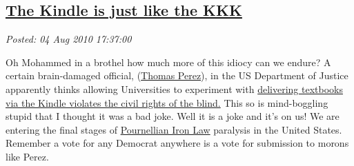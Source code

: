 %

\subsection*{\href{https://bakerjd99.wordpress.com/2010/08/04/the-kindle-is-just-like-the-kkk/}{The Kindle is just like the KKK}}


\noindent\emph{Posted: 04 Aug 2010 17:37:00}
\vspace{6pt}

Oh Mohammed in a brothel how much more of this idiocy can we endure? A
certain brain-damaged official,
(\href{http://en.wikipedia.org/wiki/Thomas\_Perez}{Thomas Perez}), in
the US Department of Justice apparently thinks allowing Universities to
experiment with
\href{http://www.washingtonexaminer.com/politics/Why-did-feds-claim-Kindle-violates-civil-rights\_-1006723-99801389.html}{delivering
textbooks via the Kindle violates the civil rights of the blind.} This
so is mind-boggling stupid that I thought it was a bad joke. Well it is
a joke and it's on us! We are entering the final stages of
\href{http://en.wikipedia.org/wiki/Jerry\_Pournelle}{Pournellian Iron
Law} paralysis in the United States. Remember a vote for any Democrat
anywhere is a vote for submission to morons like Perez.



%